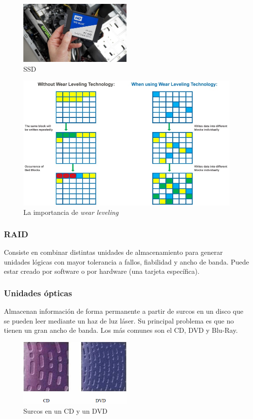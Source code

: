 \documentclass[12pt,spanish]{article}
\begin{document}
\begin{figure}[H]
	\centering
	\includegraphics[width=0.5\textwidth]{ssd.jpg}
	\caption{SSD}
\end{figure}

\begin{figure}[H]
	\centering
	\includegraphics[width=\textwidth]{wearleveling.png}
	\caption{La importancia de \textit{wear leveling}}
\end{figure}

\subsubsection{RAID}
Consiste en combinar distintas unidades de almacenamiento para generar unidades lógicas con mayor tolerancia a fallos, fiabilidad y ancho de banda. Puede estar creado por software o por hardware (una tarjeta específica).

\subsubsection{Unidades ópticas}
Almacenan información de forma permanente a partir de surcos en un disco que se pueden leer mediante un haz de luz láser. Su principal problema es que no tienen un gran ancho de banda. Los más comunes son el CD, DVD y Blu-Ray.

\begin{figure}[H]
	\centering
	\includegraphics[width=0.5\textwidth]{surcos.png}
	\caption{Surcos en un CD y un DVD}
\end{figure}
\end{document}

